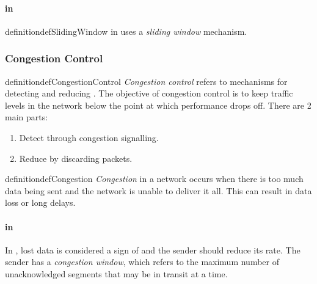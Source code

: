 \paragraph{ in }\label{par:TCP_Flow_Control}
\begin{restatable}{definition}{defSlidingWindow}\label{def:Sliding_Window}
   in  uses a \emph{sliding window} mechanism.
\end{restatable}

\subsubsection{Congestion Control}\label{subsubsec:Review_Congestion_Control}
\begin{restatable}{definition}{defCongestionControl}\label{def:Congestion_Control}
  \emph{Congestion control} refers to mechanisms for detecting and reducing .
  The objective of congestion control is to keep traffic levels in the network below the point at which performance drops off.
  There are 2 main parts:
  \begin{enumerate}[noitemsep]
  \item Detect  through congestion signalling.
  \item Reduce  by discarding packets.
  \end{enumerate}
\end{restatable}

\begin{restatable}[Congestion]{definition}{defCongestion}\label{def:Congestion}
    \emph{Congestion} in a network occurs when there is too much data being sent and the network is unable to deliver it all.
  This can result in data loss or long delays.
\end{restatable}

\paragraph{ in }\label{par:TCP_Congestion_Control}
\begin{definition}\label{def:Congestion_Window}
  In , lost data is considered a sign of  and the sender should reduce its rate.
  The sender has a \emph{congestion window}, which refers to the maximum number of unacknowledged segments that may be in transit at a time.
\end{definition}

